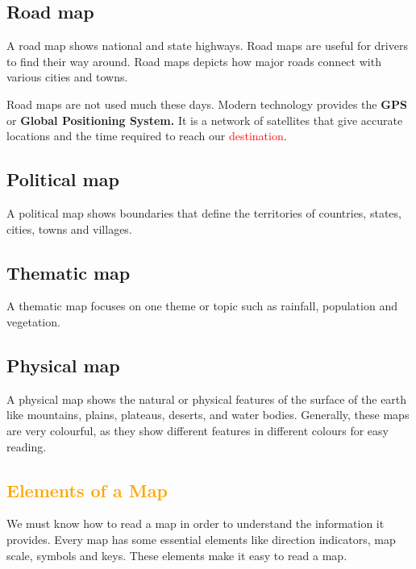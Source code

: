 \subsection{\textbf{Road map}}
A road map shows national and state highways. Road maps are useful for drivers to find their way around. Road maps depicts how major roads connect with various cities and towns.
\vspace{0.1in}
\par
Road maps are not used much these days. Modern technology provides the \textbf{GPS} or \textbf{Global Positioning System.} It is a network of satellites that give accurate locations and the time required to reach our \textcolor{red}{destination}.
\subsection{\textbf{Political map}}
A political map shows boundaries that define the territories of countries, states, cities, towns and villages.
\subsection{\textbf{Thematic map}}
A thematic map focuses on one theme or topic such as rainfall, population and vegetation.
\subsection{\textbf{Physical map}}
A physical map shows the natural or physical features of the surface of the earth like mountains, plains, plateaus, deserts, and water bodies. Generally, these maps are very colourful, as they show different features in different colours for easy reading.
\subsection{\textcolor{orange}{Elements of a Map}}
We must know how to read a map in order to understand the information it provides. Every map has some essential elements like direction indicators, map scale, symbols and keys. These elements make it easy to read a map.
